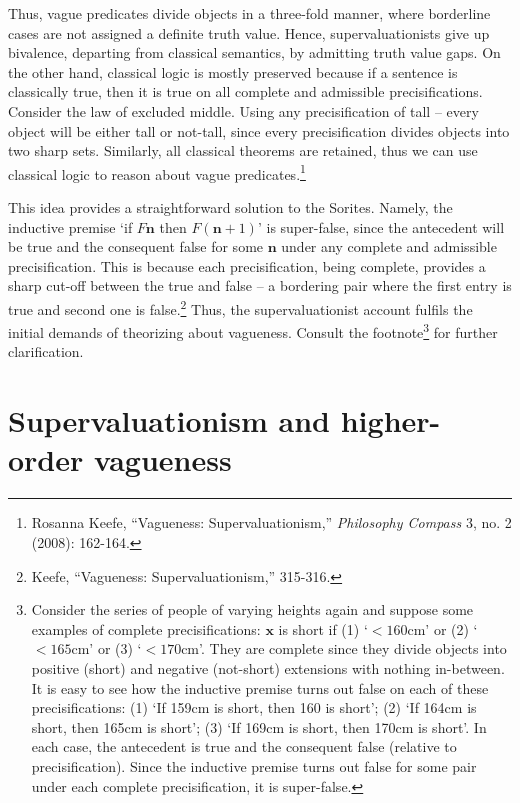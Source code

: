 Thus, vague predicates divide objects in a three-fold manner, where
borderline cases are not assigned a definite truth value. Hence,
supervaluationists give up bivalence, departing from classical
semantics, by admitting truth value gaps. On the other hand, classical
logic is mostly preserved because if a sentence is classically true,
then it is true on all complete and admissible precisifications.
Consider the law of excluded middle. Using any precisification of tall
-- every object will be either tall or not-tall, since every
precisification divides objects into two sharp sets. Similarly, all
classical theorems are retained, thus we can use classical logic to
reason about vague predicates.\footnote{Rosanna Keefe, ``Vagueness:
  Supervaluationism,'' \emph{Philosophy Compass} 3, no. 2 (2008):
  162-164.}

This idea provides a straightforward solution to the Sorites. Namely,
the inductive premise `if $F\mathbf{n}$ then $F(\mathbf{n}+1)$' is
super-false, since the antecedent will be true and the consequent false
for some $\mathbf{n}$ under any complete and admissible precisification.
This is because each precisification, being complete, provides a sharp
cut-off between the true and false -- a bordering pair where the first
entry is true and second one is false.\footnote{Keefe, ``Vagueness:
  Supervaluationism,'' 315-316.} Thus, the supervaluationist account
fulfils the initial demands of theorizing about vagueness. Consult the
footnote\footnote{Consider the series of people of varying heights again
  and suppose some examples of complete precisifications: $\mathbf{x}$ is
  short if (1) `$<160\text{cm}$' or (2) `$<165\text{cm}$' or (3)
  `$<170\text{cm}$'. They are complete since they divide objects into
  positive (short) and negative (not-short) extensions with nothing
  in-between. It is easy to see how the inductive premise turns out
  false on each of these precisifications: (1) `If 159cm is short, then
  160 is short'; (2) `If 164cm is short, then 165cm is short'; (3) `If
  169cm is short, then 170cm is short'. In each case, the antecedent is
  true and the consequent false (relative to precisification). Since the
  inductive premise turns out false for some pair under each complete
  precisification, it is super-false.} for further clarification.

\section{Supervaluationism and higher-order vagueness}

